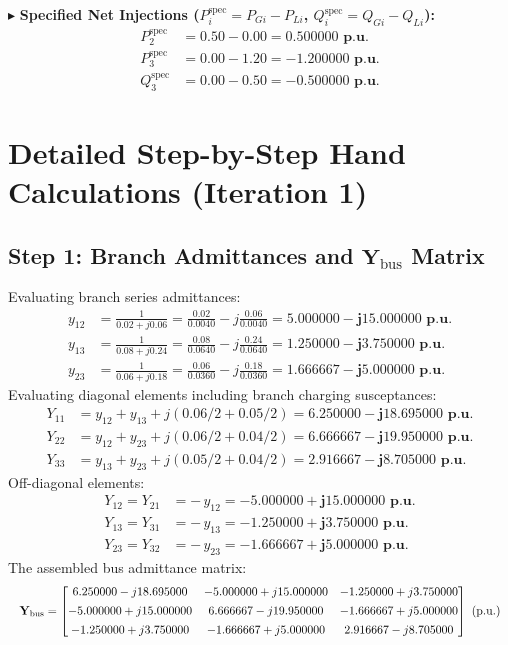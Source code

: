 \documentclass[12pt,a4paper,oneside]{report}
\begin{document}
\noindent $\blacktriangleright$ \textbf{Specified Net Injections ($P_i^{\text{spec}} = P_{Gi} - P_{Li}$, $Q_i^{\text{spec}} = Q_{Gi} - Q_{Li}$):}
\begin{align}
P_2^{\text{spec}} &= 0.50 - 0.00 = \mathbf{0.500000\text{ p.u.}} \\
P_3^{\text{spec}} &= 0.00 - 1.20 = \mathbf{-1.200000\text{ p.u.}} \\
Q_3^{\text{spec}} &= 0.00 - 0.50 = \mathbf{-0.500000\text{ p.u.}}
\end{align}

\section{Detailed Step-by-Step Hand Calculations (Iteration 1)}

\subsection{Step 1: Branch Admittances and $\mathbf{Y}_{\text{bus}}$ Matrix}
Evaluating branch series admittances:
\begin{align}
y_{12} &= \frac{1}{0.02 + j0.06} = \frac{0.02}{0.0040} - j\frac{0.06}{0.0040} = \mathbf{5.000000 - j15.000000\text{ p.u.}} \\
y_{13} &= \frac{1}{0.08 + j0.24} = \frac{0.08}{0.0640} - j\frac{0.24}{0.0640} = \mathbf{1.250000 - j3.750000\text{ p.u.}} \\
y_{23} &= \frac{1}{0.06 + j0.18} = \frac{0.06}{0.0360} - j\frac{0.18}{0.0360} = \mathbf{1.666667 - j5.000000\text{ p.u.}}
\end{align}
Evaluating diagonal elements including branch charging susceptances:
\begin{align}
Y_{11} &= y_{12} + y_{13} + j(0.06/2 + 0.05/2) = \mathbf{6.250000 - j18.695000\text{ p.u.}} \\
Y_{22} &= y_{12} + y_{23} + j(0.06/2 + 0.04/2) = \mathbf{6.666667 - j19.950000\text{ p.u.}} \\
Y_{33} &= y_{13} + y_{23} + j(0.05/2 + 0.04/2) = \mathbf{2.916667 - j8.705000\text{ p.u.}}
\end{align}
Off-diagonal elements:
\begin{align}
Y_{12} = Y_{21} &= -\, y_{12} = \mathbf{-5.000000 + j15.000000\text{ p.u.}} \\
Y_{13} = Y_{31} &= -\, y_{13} = \mathbf{-1.250000 + j3.750000\text{ p.u.}} \\
Y_{23} = Y_{32} &= -\, y_{23} = \mathbf{-1.666667 + j5.000000\text{ p.u.}}
\end{align}
The assembled bus admittance matrix:
\begin{equation}
\resizebox{\linewidth}{!}{$
\mathbf{Y}_{\text{bus}} = 
\begin{bmatrix}
6.250000 - j18.695000 & -5.000000 + j15.000000 & -1.250000 + j3.750000 \\[4pt]
-5.000000 + j15.000000 & 6.666667 - j19.950000 & -1.666667 + j5.000000 \\[4pt]
-1.250000 + j3.750000 & -1.666667 + j5.000000 & 2.916667 - j8.705000
\end{bmatrix}\text{ (p.u.)}
$}
\end{equation}
\end{document}
